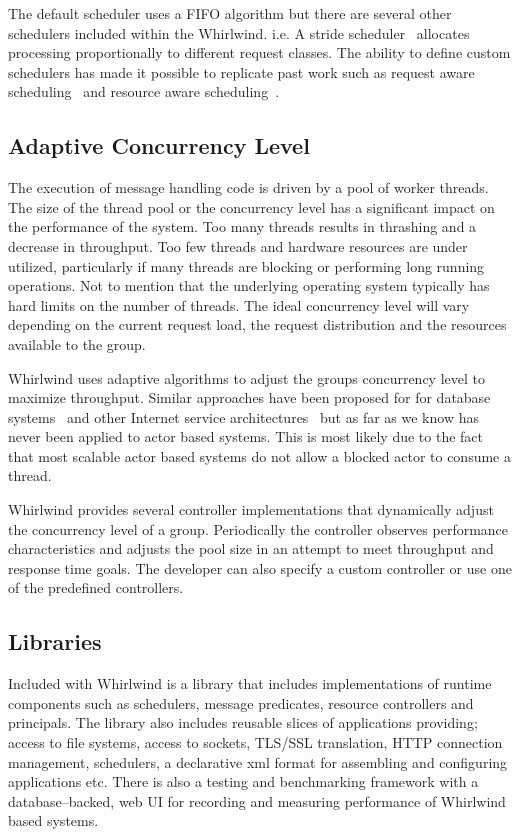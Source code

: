 \documentclass[conference,a4paper,final]{IEEEtran}
\begin{document}
The default scheduler uses a FIFO algorithm but there are several other schedulers included within the Whirlwind. i.e. A stride scheduler~\cite{Stride:Waldspurger:95} allocates processing proportionally to different request classes. The ability to define custom schedulers has made it possible to replicate past work such as request aware scheduling~\cite{Zhou06RequestAware} and resource aware scheduling~\cite{Behren03Capriccio}.

\subsection{Adaptive Concurrency Level}

The execution of message handling code is driven by a pool of worker threads. The size of the thread pool or the concurrency level has a significant impact on the performance of the system. Too many threads results in thrashing and a decrease in throughput. Too few threads and hardware resources are under utilized, particularly if many threads are blocking or performing long running operations. Not to mention that the underlying operating system typically has hard limits on the number of threads. The ideal concurrency level will vary depending on the current request load, the request distribution and the resources available to the group.

Whirlwind uses adaptive algorithms to adjust the groups concurrency level to maximize throughput. Similar approaches have been proposed for for database systems~\cite{Heiss:91:AdaptiveLoadControl} and other Internet service architectures~\cite{welsh03Adaptive} but as far as we know has never been applied to actor based systems. This is most likely due to the fact that most scalable actor based systems do not allow a blocked actor to consume a thread.

Whirlwind provides several controller implementations that dynamically adjust the concurrency level of a group. Periodically the controller observes performance characteristics and adjusts the pool size in an attempt to meet throughput and response time goals. The developer can also specify a custom controller or use one of the predefined controllers.

\subsection{Libraries}

Included with Whirlwind is a library that includes implementations of runtime components such as schedulers, message predicates, resource controllers and principals. The library also includes reusable slices of applications providing; access to file systems, access to sockets, TLS/SSL translation, HTTP connection management, schedulers, a declarative xml format for assembling and configuring applications etc. There is also a testing and benchmarking framework with a database--backed, web UI for recording and measuring performance of Whirlwind based systems.
\end{document}
